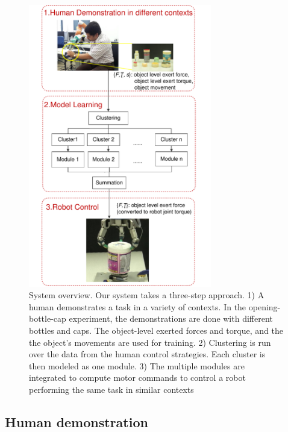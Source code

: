 \begin{figure}
  \centering
   \includegraphics[width=8cm]{./fig/overview3.pdf}
   \caption{ \scriptsize{System overview. Our system takes a
       three-step approach. 1) A human demonstrates a task in a
       variety of contexts. In the opening-bottle-cap experiment, the
       demonstrations are done with different bottles and caps. The
       object-level exerted forces and torque, and the the object's
       movements are used for training. 2) Clustering is run over the data from the human control
       strategies. Each cluster is then modeled as one module. 3) The
       multiple modules are integrated to compute motor commands to
       control a robot performing the same task in similar contexts}  }
\label{fig:overview}
\end{figure}

\subsection{Human demonstration}
\label{sec:demo}


